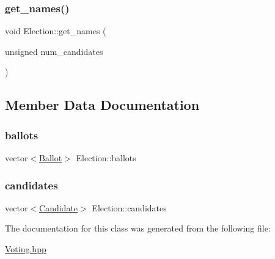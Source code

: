 \mbox{\label{classElection_ad2e887d21e4a8dc2e0520d582f0e41ec}} 
\subsubsection{\texorpdfstring{get\+\_\+names()}{get\_names()}}
{\footnotesize\ttfamily void Election\+::get\+\_\+names (\begin{DoxyParamCaption}\item[{unsigned}]{num\+\_\+candidates }\end{DoxyParamCaption})\hspace{0.3cm}{\ttfamily [inline]}}



\subsection{Member Data Documentation}
\mbox{\label{classElection_a567625e2e211bbfc5897989b1edecaab}} 
\subsubsection{\texorpdfstring{ballots}{ballots}}
{\footnotesize\ttfamily vector$<$\hyperlink{classBallot}{Ballot}$>$ Election\+::ballots}

\mbox{\label{classElection_a0715aedc20d195a1d88fcb2e32e14e1c}} 
\subsubsection{\texorpdfstring{candidates}{candidates}}
{\footnotesize\ttfamily vector$<$\hyperlink{classCandidate}{Candidate}$>$ Election\+::candidates}



The documentation for this class was generated from the following file\+:\begin{DoxyCompactItemize}
\item 
\hyperlink{Voting_8hpp}{Voting.\+hpp}\end{DoxyCompactItemize}
